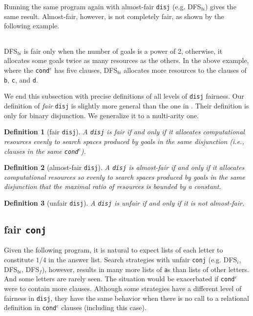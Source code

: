 \documentclass[format=acmlarge, review=true, authordraft=true]{acmart}
\newcommand{\conde}{\texttt{cond$^e$}}
\newcommand{\conj}{\texttt{conj}}
\newcommand{\disj}{\texttt{disj}}
\newcommand{\DFSi }[0]{DFS$_{i}$}
\newcommand{\DFSf }[0]{DFS$_{f}$}
\newcommand{\DFSbi}[0]{DFS$_{bi}$}
\newtheorem{defn}{Definition}[section]
\begin{document}
Running the same program again with almost-fair \disj {} (e.g. 
\DFSbi{}) gives the same result. Almost-fair, however, is not 
completely fair, as shown by the following example. 

\begin{center}
	\begin{tabular}{c}
		
	\end{tabular}
\end{center}

\DFSbi{} is fair only when the number of goals is a power of 2, 
otherwise, it allocates some goals twice as many resources as the 
others. In the above example, where the \conde{} has five clauses, \DFSbi{} 
allocates more resources to the clauses of \texttt{b}, \texttt{c}, and 
\texttt{d}.

We end this subsection with precise definitions of all levels of 
\disj{} fairness. Our definition of \emph{fair} \disj{} is slightly 
more general
than the one in \citet{seres1999algebra}. Their definition is only
for binary disjunction. We generalize it to a multi-arity one.

\begin{defn}[fair \disj{}]
A \disj{} is fair if and only if it allocates computational resources evenly to 
search spaces produced by goals in the same disjunction 
(i.e., clauses in the same \conde).
\end{defn}

\begin{defn}[almost-fair \disj{}]
A \disj{} is almost-fair if and only if it allocates computational resources
so evenly to search spaces produced by goals in the same disjunction that 
the maximal ratio of resources is bounded by a constant.
\end{defn}

\begin{defn}[unfair \disj{}]
A \disj{} is unfair if and only if it is not almost-fair.
\end{defn}

\subsection{fair \texttt{conj}}
\label{sec:fairconj}

Given the following program, it is natural to expect lists of each letter to
constitute $1/4$ in the answer list. Search strategies with unfair \conj{} 
(e.g. 
\DFSi, \DFSbi, \DFSf), however, results in many more lists of \texttt{a}s than 
lists of other letters. And some letters are rarely seen. The situation would 
be exacerbated if \conde{} were to contain more clauses.
Although some strategies have a different level of fairness in \disj{}, they 
have the same behavior when there is no call to a relational definition in 
\conde{} clauses (including this case).
\end{document}
